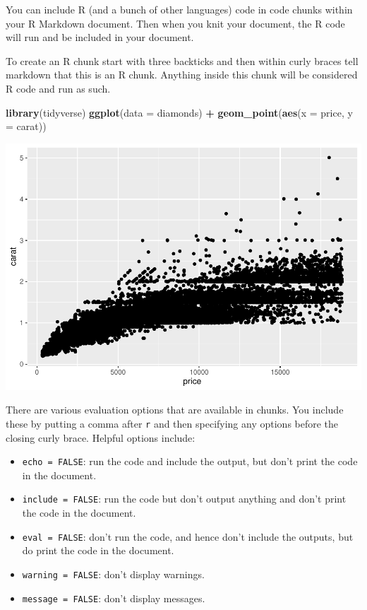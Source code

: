 \documentclass[
]{book}
\newenvironment{Shaded}{\begin{snugshade}}{\end{snugshade}}
\newcommand{\DataTypeTok}[1]{\textcolor[rgb]{0.13,0.29,0.53}{#1}}
\newcommand{\KeywordTok}[1]{\textcolor[rgb]{0.13,0.29,0.53}{\textbf{#1}}}
\newcommand{\NormalTok}[1]{#1}
\newcommand{\OperatorTok}[1]{\textcolor[rgb]{0.81,0.36,0.00}{\textbf{#1}}}
\newcommand{\StringTok}[1]{\textcolor[rgb]{0.31,0.60,0.02}{#1}}
\providecommand{\tightlist}{%
  \setlength{\itemsep}{0pt}\setlength{\parskip}{0pt}}
\begin{document}
You can include R (and a bunch of other languages) code in code chunks within your R Markdown document. Then when you knit your document, the R code will run and be included in your document.

To create an R chunk start with three backticks and then within curly braces tell markdown that this is an R chunk. Anything inside this chunk will be considered R code and run as such.

\begin{Shaded}
\begin{Highlighting}[]
\KeywordTok{library}\NormalTok{(tidyverse)}
\KeywordTok{ggplot}\NormalTok{(}\DataTypeTok{data =}\NormalTok{ diamonds) }\OperatorTok{+}\StringTok{ }
\StringTok{  }\KeywordTok{geom_point}\NormalTok{(}\KeywordTok{aes}\NormalTok{(}\DataTypeTok{x =}\NormalTok{ price, }\DataTypeTok{y =}\NormalTok{ carat))}
\end{Highlighting}
\end{Shaded}

\includegraphics{telling_stories_with_data_files/figure-latex/unnamed-chunk-79-1.pdf}

There are various evaluation options that are available in chunks. You include these by putting a comma after \texttt{r} and then specifying any options before the closing curly brace. Helpful options include:

\begin{itemize}
\tightlist
\item
  \texttt{echo\ =\ FALSE}: run the code and include the output, but don't print the code in the document.
\item
  \texttt{include\ =\ FALSE}: run the code but don't output anything and don't print the code in the document.
\item
  \texttt{eval\ =\ FALSE}: don't run the code, and hence don't include the outputs, but do print the code in the document.
\item
  \texttt{warning\ =\ FALSE}: don't display warnings.
\item
  \texttt{message\ =\ FALSE}: don't display messages.
\end{itemize}
\end{document}
